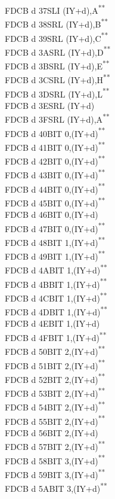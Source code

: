 \documentclass[12pt,twoside,openright,a4paper]{book}
\newcommand{\UNDOC}{\textnormal{\textsuperscript{**}}}
\begin{document}
\begin{multicols}{3}
{\begin{tabbing}
	FDCB d 37\>SLI (IY+d),A\UNDOC\\
	FDCB d 38\>SRL (IY+d),B\UNDOC\\
	FDCB d 39\>SRL (IY+d),C\UNDOC\\
	FDCB d 3A\>SRL (IY+d),D\UNDOC\\
	FDCB d 3B\>SRL (IY+d),E\UNDOC\\
	FDCB d 3C\>SRL (IY+d),H\UNDOC\\
	FDCB d 3D\>SRL (IY+d),L\UNDOC\\
	FDCB d 3E\>SRL (IY+d)\\
	FDCB d 3F\>SRL (IY+d),A\UNDOC\\
	FDCB d 40\>BIT 0,(IY+d)\UNDOC\\
	FDCB d 41\>BIT 0,(IY+d)\UNDOC\\
	FDCB d 42\>BIT 0,(IY+d)\UNDOC\\
	FDCB d 43\>BIT 0,(IY+d)\UNDOC\\
	FDCB d 44\>BIT 0,(IY+d)\UNDOC\\
	FDCB d 45\>BIT 0,(IY+d)\UNDOC\\
	FDCB d 46\>BIT 0,(IY+d)\\
	FDCB d 47\>BIT 0,(IY+d)\UNDOC\\
	FDCB d 48\>BIT 1,(IY+d)\UNDOC\\
	FDCB d 49\>BIT 1,(IY+d)\UNDOC\\
	FDCB d 4A\>BIT 1,(IY+d)\UNDOC\\
	FDCB d 4B\>BIT 1,(IY+d)\UNDOC\\
	FDCB d 4C\>BIT 1,(IY+d)\UNDOC\\
	FDCB d 4D\>BIT 1,(IY+d)\UNDOC\\
	FDCB d 4E\>BIT 1,(IY+d)\\
	FDCB d 4F\>BIT 1,(IY+d)\UNDOC\\
	FDCB d 50\>BIT 2,(IY+d)\UNDOC\\
	FDCB d 51\>BIT 2,(IY+d)\UNDOC\\
	FDCB d 52\>BIT 2,(IY+d)\UNDOC\\
	FDCB d 53\>BIT 2,(IY+d)\UNDOC\\
	FDCB d 54\>BIT 2,(IY+d)\UNDOC\\
	FDCB d 55\>BIT 2,(IY+d)\UNDOC\\
	FDCB d 56\>BIT 2,(IY+d)\\
	FDCB d 57\>BIT 2,(IY+d)\UNDOC\\
	FDCB d 58\>BIT 3,(IY+d)\UNDOC\\
	FDCB d 59\>BIT 3,(IY+d)\UNDOC\\
	FDCB d 5A\>BIT 3,(IY+d)\UNDOC\\

\end{tabbing}}
\end{multicols}
\end{document}
